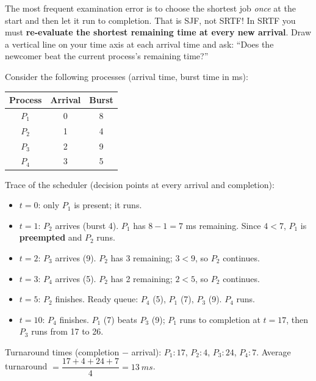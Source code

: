 \documentclass[11pt]{article}
\begin{document}
\begin{attention}
The most frequent examination error is to choose the shortest job \emph{once} at the start and then let it run to completion. That is SJF, not SRTF! In SRTF you must \textbf{re-evaluate the shortest remaining time at every new arrival}. Draw a vertical line on your time axis at each arrival time and ask: ``Does the newcomer beat the current process's remaining time?''
\end{attention}

\begin{exemplebox}
Consider the following processes (arrival time, burst time in ms):
\begin{center}
\begin{tabular}{|c|c|c|}
\hline
\rowcolor{popblueL} Process & Arrival & Burst \\
\hline
$P_1$ & 0 & 8 \\
$P_2$ & 1 & 4 \\
$P_3$ & 2 & 9 \\
$P_4$ & 3 & 5 \\
\hline
\end{tabular}
\end{center}
Trace of the scheduler (decision points at every arrival and completion):
\begin{itemize}
\item $t=0$: only $P_1$ is present; it runs.
\item $t=1$: $P_2$ arrives (burst 4). $P_1$ has $8-1=7$ ms remaining. Since $4 < 7$, $P_1$ is \textbf{preempted} and $P_2$ runs.
\item $t=2$: $P_3$ arrives (9). $P_2$ has 3 remaining; $3 < 9$, so $P_2$ continues.
\item $t=3$: $P_4$ arrives (5). $P_2$ has 2 remaining; $2 < 5$, so $P_2$ continues.
\item $t=5$: $P_2$ finishes. Ready queue: $P_4$ (5), $P_1$ (7), $P_3$ (9). $P_4$ runs.
\item $t=10$: $P_4$ finishes. $P_1$ (7) beats $P_3$ (9); $P_1$ runs to completion at $t=17$, then $P_3$ runs from 17 to 26.
\end{itemize}
Turnaround times (completion $-$ arrival): $P_1: 17$, $P_2: 4$, $P_3: 24$, $P_4: 7$. Average turnaround $= \dfrac{17+4+24+7}{4} = \SI{13}{ms}$.
\end{exemplebox}
\end{document}
